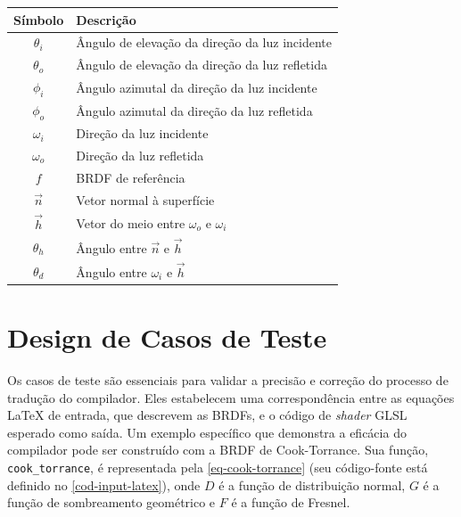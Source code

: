 \begin{table}[h]
    \centering
    \begin{tabular}{cl}
        \hline
        \textbf{Símbolo} & \textbf{Descrição} \\
        \hline
        $\theta_i$ & Ângulo de elevação da direção da luz incidente \\
        \hline
        $\theta_o$ & Ângulo de elevação da direção da luz refletida \\
        \hline
        $\phi_i$ & Ângulo azimutal da direção da luz incidente \\
        \hline
        $\phi_o$ & Ângulo azimutal da direção da luz refletida \\
        \hline
        $\omega_i$ & Direção da luz incidente  \\
        \hline
        $\omega_o$ & Direção da luz refletida  \\
        \hline
        $f$ & BRDF de referência \\
        \hline
        $\vec{n}$ & Vetor normal à superfície \\
        \hline
        $\vec{h}$ & Vetor do meio entre $\omega_o$ e $\omega_i$ \\
        \hline
        $\theta_h$ & Ângulo entre $\vec{n}$ e $\vec{h}$ \\
        \hline
        $\theta_d$ & Ângulo entre $\omega_i$ e $\vec{h}$ \\
        \hline
    \end{tabular}
    \label{tab-conventions}
\end{table}
%
%
\section{Design de Casos de Teste} \label{testes}
%
%
Os casos de teste são essenciais para validar a precisão e correção do processo de tradução do compilador. Eles estabelecem uma correspondência entre as equações \LaTeX{} de entrada, que descrevem as BRDFs, e o código de \textit{shader} GLSL esperado como saída. Um exemplo específico que demonstra a eficácia do compilador pode ser construído com a BRDF de Cook-Torrance. Sua função, \texttt{cook\_torrance}, é representada pela \autoref{eq-cook-torrance} (seu código-fonte está definido no \autoref{cod-input-latex}), onde \(D\) é a função de distribuição normal, \(G\) é a função de sombreamento geométrico e \(F\) é a função de Fresnel.


